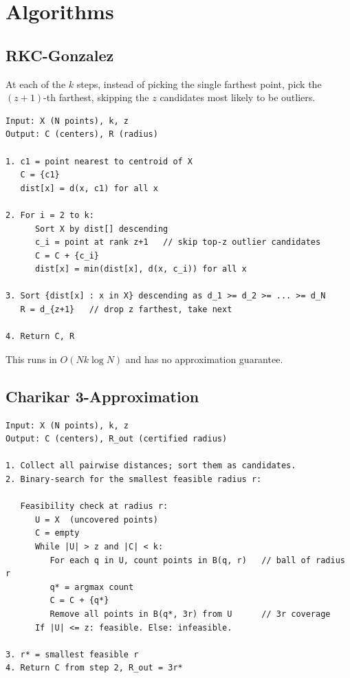\documentclass[11pt]{article}
\begin{document}
\section{Algorithms}

\subsection{RKC-Gonzalez}

At each of the $k$ steps, instead of picking the single farthest point, pick the $(z{+}1)$-th farthest, skipping the $z$ candidates most likely to be outliers.

\begin{verbatim}
Input: X (N points), k, z
Output: C (centers), R (radius)

1. c1 = point nearest to centroid of X
   C = {c1}
   dist[x] = d(x, c1) for all x

2. For i = 2 to k:
      Sort X by dist[] descending
      c_i = point at rank z+1   // skip top-z outlier candidates
      C = C + {c_i}
      dist[x] = min(dist[x], d(x, c_i)) for all x

3. Sort {dist[x] : x in X} descending as d_1 >= d_2 >= ... >= d_N
   R = d_{z+1}   // drop z farthest, take next

4. Return C, R
\end{verbatim}

This runs in $O(Nk \log N)$ and has no approximation guarantee.

\subsection{Charikar 3-Approximation}

\begin{verbatim}
Input: X (N points), k, z
Output: C (centers), R_out (certified radius)

1. Collect all pairwise distances; sort them as candidates.
2. Binary-search for the smallest feasible radius r:

   Feasibility check at radius r:
      U = X  (uncovered points)
      C = empty
      While |U| > z and |C| < k:
         For each q in U, count points in B(q, r)   // ball of radius r
         q* = argmax count
         C = C + {q*}
         Remove all points in B(q*, 3r) from U      // 3r coverage
      If |U| <= z: feasible. Else: infeasible.

3. r* = smallest feasible r
4. Return C from step 2, R_out = 3r*
\end{verbatim}
\end{document}
